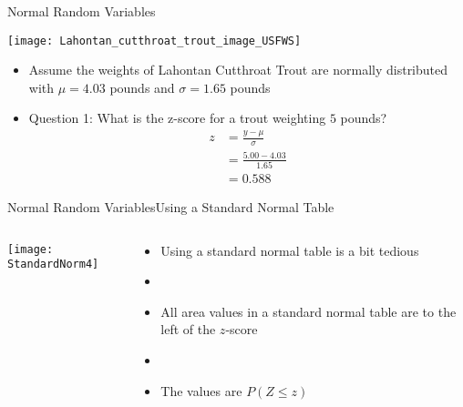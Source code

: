 \documentclass[xcolor=dvipsnames]{beamer}
\begin{document}
\begin{frame}{Normal Random Variables}
	\begin{center}
		\texttt{[image: Lahontan\_cutthroat\_trout\_image\_USFWS]}
	\end{center}
	\begin{itemize}
		\item Assume the weights of Lahontan Cutthroat Trout are normally distributed with $\mu = 4.03$ pounds and $\sigma = 1.65$ pounds
		\item Question 1: What is the z-score for a trout weighting $5$ pounds?
		\begin{align*}
			z &= \frac{y-\mu}{\sigma} \\
			&= \frac{5.00-4.03}{1.65} \\
			&= 0.588
		\end{align*}
	\end{itemize}
\end{frame}

\begin{frame}{Normal Random Variables}{Using a Standard Normal Table}
	\begin{columns}
		\begin{column}{.6 \textwidth}
				\begin{center}
				\texttt{[image: StandardNorm4]}
			\end{center}
		\end{column}
	\begin{column}{.4 \textwidth}
			\begin{itemize}
			\item Using a standard normal table is a bit tedious
			\item[]
			\item All area values in a standard normal table are to the left of the $z$-score
			\item[]
			\item The values are $P(Z\leq z)$
		\end{itemize}
	\end{column}
	\end{columns}
\end{frame}
\end{document}
